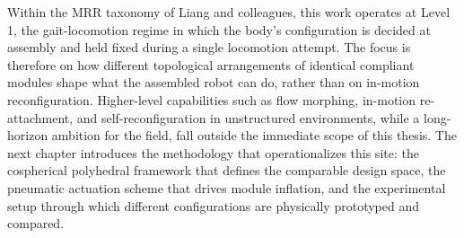 Within the MRR taxonomy of Liang and colleagues, this work operates at Level 1, the gait-locomotion regime in which the body's configuration is decided at assembly and held fixed during a single locomotion attempt. The focus is therefore on how different topological arrangements of identical compliant modules shape what the assembled robot can do, rather than on in-motion reconfiguration. Higher-level capabilities such as flow morphing, in-motion re-attachment, and self-reconfiguration in unstructured environments, while a long-horizon ambition for the field, fall outside the immediate scope of this thesis. The next chapter introduces the methodology that operationalizes this site: the cospherical polyhedral framework that defines the comparable design space, the pneumatic actuation scheme that drives module inflation, and the experimental setup through which different configurations are physically prototyped and compared.
